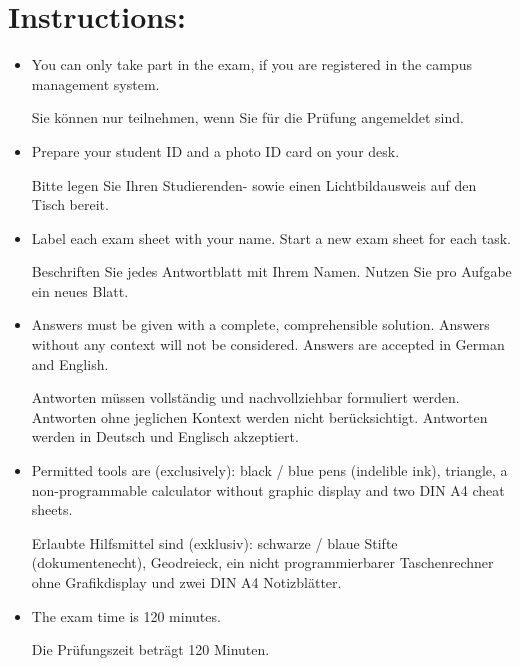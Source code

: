 \section*{\hspace*{2mm}Instructions:}
\begin{itemize}
    \item You can only take part in the exam, if you are registered in the campus management system.

          \begin{germanblock}
              Sie können nur teilnehmen, wenn Sie für die Prüfung angemeldet sind.
          \end{germanblock}
    \item Prepare your student ID and a photo ID card on your desk.

          \begin{germanblock}
              Bitte legen Sie Ihren Studierenden- sowie einen Lichtbildausweis auf den Tisch bereit.
          \end{germanblock}
    \item Label each exam sheet with your name. Start a new exam sheet for each task.

          \begin{germanblock}
              Beschriften Sie jedes Antwortblatt mit Ihrem Namen. Nutzen Sie pro  Aufgabe ein neues Blatt.
          \end{germanblock}
    \item Answers must be given with a complete, comprehensible solution. Answers without any context will not be considered. Answers are accepted in German and English.

          \begin{germanblock}
              Antworten müssen vollständig und nachvollziehbar formuliert werden. Antworten ohne jeglichen Kontext werden nicht berücksichtigt. Antworten werden in Deutsch und Englisch akzeptiert.
          \end{germanblock}
    \item Permitted tools are (exclusively): black / blue pens (indelible ink), triangle, a non-programmable calculator without graphic display and two DIN A4 cheat sheets.

          \begin{germanblock}
              Erlaubte Hilfsmittel sind (exklusiv): schwarze / blaue Stifte (dokumentenecht), Geodreieck, ein nicht programmierbarer Taschenrechner ohne Grafikdisplay und zwei DIN A4 Notizblätter.
          \end{germanblock}
    \item The exam time is 120 minutes.

          \begin{germanblock}
              Die Prüfungszeit beträgt 120 Minuten.
          \end{germanblock}
\end{itemize}

